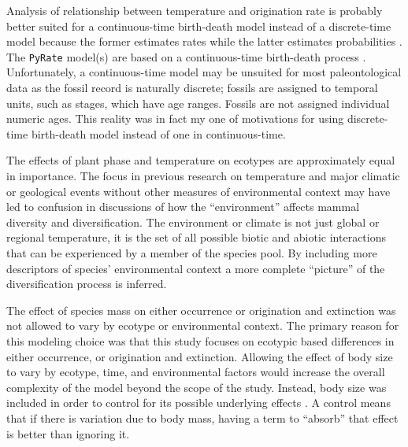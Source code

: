\documentclass[12pt,letterpaper]{article}
\begin{document}
Analysis of relationship between temperature and origination rate is probably better suited for a continuous-time birth-death model instead of a discrete-time model because the former estimates rates while the latter estimates probabilities \citep{Allen2011}. The \texttt{PyRate} model(s) are based on a continuous-time birth-death process \citep{Silvestro2014a,Silvestro2015b}. Unfortunately, a continuous-time model may be unsuited for most paleontological data as the fossil record is naturally discrete; fossils are assigned to temporal units, such as stages, which have age ranges. Fossils are not assigned individual numeric ages. This reality was in fact my one of motivations for using discrete-time birth-death model instead of one in continuous-time.

The effects of plant phase and temperature on ecotypes are approximately equal in importance. The focus in previous research on temperature and major climatic or geological events without other measures of environmental context may have led to confusion in discussions of how the ``environment'' affects mammal diversity and diversification. The environment or climate is not just global or regional temperature, it is the set of all possible biotic and abiotic interactions that can be experienced by a member of the species pool. By including more descriptors of species' environmental context a more complete ``picture'' of the diversification process is inferred.


The effect of species mass on either occurrence or origination and extinction was not allowed to vary by ecotype or environmental context. The primary reason for this modeling choice was that this study focuses on ecotypic based differences in either occurrence, or origination and extinction. Allowing the effect of body size to vary by ecotype, time, and environmental factors would increase the overall complexity of the model beyond the scope of the study. Instead, body size was included in order to control for its possible underlying effects \citep{McElreath2016}. A control means that if there is variation due to body mass, having a term to ``absorb'' that effect is better than ignoring it. %
\end{document}

